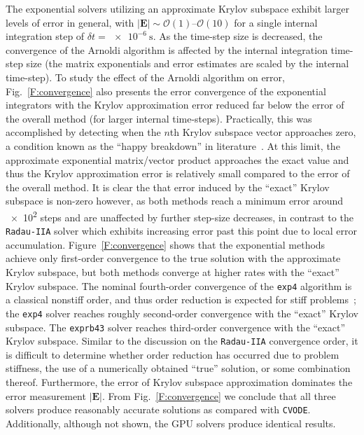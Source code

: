 \documentclass[preprint,review,11pt]{elsarticle}
\begin{document}
The exponential solvers utilizing an approximate Krylov subspace exhibit larger levels of error in general, with $\left\lvert\textbf{E}\right\rvert \sim \mathcal{O}(1)\text{--}\mathcal{O}(10)$ for a single internal integration step of $\delta t = \SI{e-6}{\second}$.
As the time-step size is decreased, the convergence of the Arnoldi algorithm is affected by the internal integration time-step size (the matrix exponentials and error estimates are scaled by the internal time-step).
To study the effect of the Arnoldi algorithm on error, Fig.~\ref{F:convergence} also presents the error convergence of the exponential integrators with the Krylov approximation error reduced far below the error of the overall method (for larger internal time-steps).
Practically, this was accomplished by detecting when the $n$th Krylov subspace vector approaches zero, a condition known as the ``happy breakdown'' in literature~\cite{datta2010numerical}.
At this limit, the approximate exponential matrix\slash vector product approaches the exact value and thus the Krylov approximation error is relatively small compared to the error of the overall method.
It is clear the that error induced by the ``exact'' Krylov subspace is non-zero however, as both methods reach a minimum error around \num{e2} steps and are unaffected by further step-size decreases, in contrast to the \texttt{Radau-IIA} solver which exhibits increasing error past this point due to local error accumulation.
Figure~\ref{F:convergence} shows that the exponential methods achieve only first-order convergence to the true solution with the approximate Krylov subspace, but both methods converge at higher rates with the ``exact'' Krylov subspace.
The nominal fourth-order convergence of the \texttt{exp4} algorithm is a classical nonstiff order, and thus order reduction is expected for stiff problems~\cite{ANU:7701740,Bisetti:2012jw}; the \texttt{exp4} solver reaches roughly second-order convergence with the ``exact'' Krylov subspace.
The \texttt{exprb43} solver reaches third-order convergence with the ``exact'' Krylov subspace.
Similar to the discussion on the \texttt{Radau-IIA} convergence order, it is difficult to determine whether order reduction has occurred due to problem stiffness, the use of a numerically obtained ``true'' solution, or some combination thereof.
Furthermore, the error of Krylov subspace approximation dominates the error measurement $\lvert\textbf{E}\rvert$.
From Fig.~\ref{F:convergence} we conclude that all three solvers produce reasonably accurate solutions as compared with \texttt{CVODE}.
Additionally, although not shown, the GPU solvers produce identical results.
\end{document}

